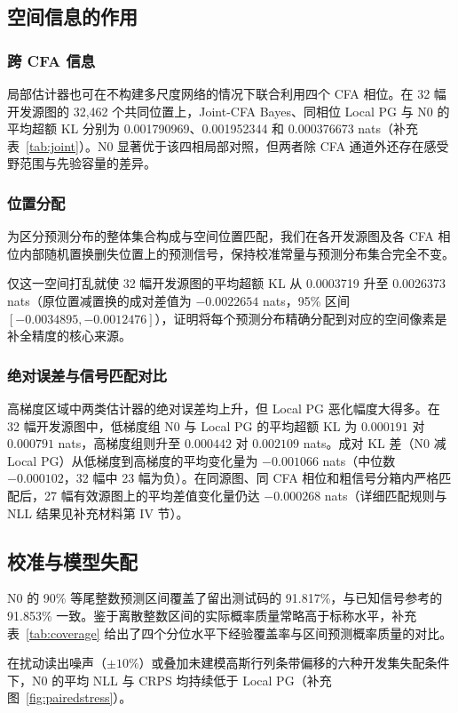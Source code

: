 \documentclass[10pt,twocolumn,journal]{IEEEtran}
\begin{document}
\subsection{空间信息的作用}
\subsubsection{跨 CFA 信息}
局部估计器也可在不构建多尺度网络的情况下联合利用四个 CFA 相位。在 32 幅开发源图的 32,462 个共同位置上，Joint-CFA Bayes、同相位 Local PG 与 N0 的平均超额 KL 分别为 0.001790969、0.001952344 和 0.000376673 nats（补充表~\ref{tab:joint}）。N0 显著优于该四相局部对照，但两者除 CFA 通道外还存在感受野范围与先验容量的差异。

\subsubsection{位置分配}
为区分预测分布的整体集合构成与空间位置匹配，我们在各开发源图及各 CFA 相位内部随机置换删失位置上的预测信号，保持校准常量与预测分布集合完全不变。

仅这一空间打乱就使 32 幅开发源图的平均超额 KL 从 0.0003719 升至 0.0026373 nats（原位置减置换的成对差值为 $-0.0022654$ nats，95\% 区间 $[-0.0034895,-0.0012476]$），证明将每个预测分布精确分配到对应的空间像素是补全精度的核心来源。

\subsubsection{绝对误差与信号匹配对比}\label{sec:gradientcontrol}
高梯度区域中两类估计器的绝对误差均上升，但 Local PG 恶化幅度大得多。在 32 幅开发源图中，低梯度组 N0 与 Local PG 的平均超额 KL 为 $0.000191$ 对 $0.000791$ nats，高梯度组则升至 $0.000442$ 对 $0.002109$ nats。成对 KL 差（N0 减 Local PG）从低梯度到高梯度的平均变化量为 $-0.001066$ nats（中位数 $-0.000102$，32 幅中 23 幅为负）。在同源图、同 CFA 相位和粗信号分箱内严格匹配后，27 幅有效源图上的平均差值变化量仍达 $-0.000268$ nats（详细匹配规则与 NLL 结果见补充材料第 IV 节）。

\subsection{校准与模型失配}
N0 的 90\% 等尾整数预测区间覆盖了留出测试码的 91.817\%，与已知信号参考的 91.853\% 一致。鉴于离散整数区间的实际概率质量常略高于标称水平，补充表~\ref{tab:coverage} 给出了四个分位水平下经验覆盖率与区间预测概率质量的对比。

在扰动读出噪声（$\pm10\%$）或叠加未建模高斯行列条带偏移的六种开发集失配条件下，N0 的平均 NLL 与 CRPS 均持续低于 Local PG（补充图~\ref{fig:pairedstress}）。
\end{document}
